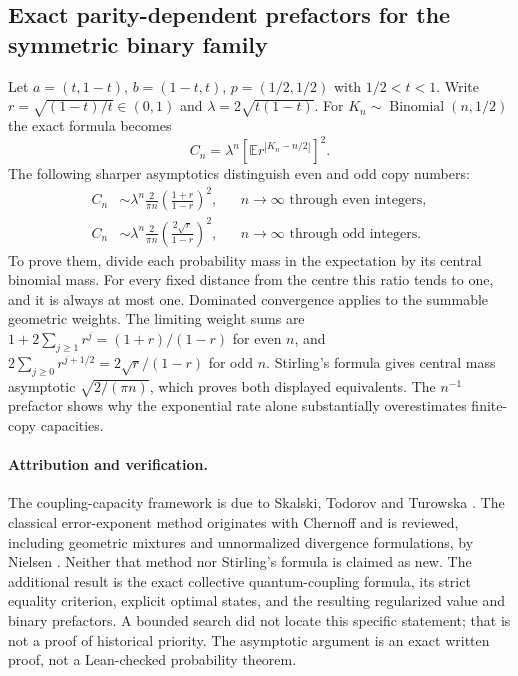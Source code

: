 \subsection{Exact parity-dependent prefactors for the symmetric binary family}
Let $a=(t,1-t)$, $b=(1-t,t)$, $p=(1/2,1/2)$ with $1/2<t<1$.
Write $r=\sqrt{(1-t)/t}\in(0,1)$ and $\lambda=2\sqrt{t(1-t)}$.
For $K_n\sim\operatorname{Binomial}(n,1/2)$ the exact formula becomes
\begin{equation}\label{eq:binary-expectation}
 C_n=\lambda^n\left[\mathbb E r^{|K_n-n/2|}\right]^2.
\end{equation}
The following sharper asymptotics distinguish even and odd copy numbers:
\begin{align}
 C_n&\sim\lambda^n\frac2{\pi n}
           \left(\frac{1+r}{1-r}\right)^2,
             &&n\to\infty\text{ through even integers},\label{eq:binary-even}\\
 C_n&\sim\lambda^n\frac2{\pi n}
           \left(\frac{2\sqrt r}{1-r}\right)^2,
             &&n\to\infty\text{ through odd integers}.\label{eq:binary-odd}
\end{align}
To prove them, divide each probability mass in the expectation by its
central binomial mass. For every fixed distance from the centre this
ratio tends to one, and it is always at most one. Dominated convergence
applies to the summable geometric weights. The limiting weight sums are
$1+2\sum_{j\ge1}r^j=(1+r)/(1-r)$ for even $n$, and
$2\sum_{j\ge0}r^{j+1/2}=2\sqrt r/(1-r)$ for odd $n$.
Stirling's formula gives central mass asymptotic
$\sqrt{2/(\pi n)}$, which proves both displayed equivalents.
The $n^{-1}$ prefactor shows why the exponential rate alone substantially
overestimates finite-copy capacities.

\paragraph{Attribution and verification.}
The coupling-capacity framework is due to Skalski, Todorov and Turowska
\cite{capacity2025}. The classical error-exponent method originates with
Chernoff and is reviewed, including geometric mixtures and unnormalized
divergence formulations, by Nielsen \cite{nielsen2022}. Neither that
method nor Stirling's formula is claimed as new. The additional result is
the exact collective quantum-coupling formula, its strict equality
criterion, explicit optimal states, and the resulting regularized value
and binary prefactors. A bounded search did not locate this specific
statement; that is not a proof of historical priority. The asymptotic
argument is an exact written proof, not a Lean-checked probability theorem.
